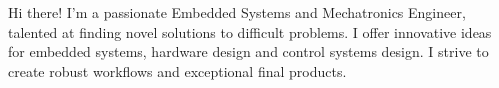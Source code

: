 %
%
%
\par{
	Hi there! I'm a passionate Embedded Systems and Mechatronics Engineer, talented at finding novel solutions to difficult problems.
	I offer innovative ideas for embedded systems, hardware design and control systems design. I strive to create robust
	workflows and exceptional final products.
}